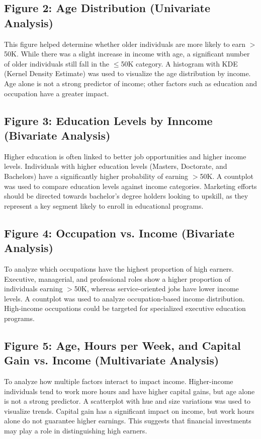 \documentclass[journal,onecolumn]{IEEEtran}
\begin{document}
\subsection{Figure 2: Age Distribution (Univariate Analysis)}
This figure helped determine whether older individuals are more likely to 
earn $>$50K. While there was a slight increase in income with age, a 
significant number of older individuals still fall in the $\leq$50K category.
A histogram with KDE (Kernel Density Estimate) was used to visualize the 
age distribution by income. Age alone is not a strong predictor of income; 
other factors such as education and occupation have a greater impact.

\subsection{Figure 3: Education Levels by Inncome (Bivariate Analysis)}
Higher education is often linked to better job opportunities and higher 
income levels. Individuals with higher education levels (Masters, Doctorate, 
and Bachelors) have a significantly higher probability of earning $>$50K. 
A countplot was used to compare education levels against income categories. 
Marketing efforts should be directed towards bachelor's degree holders 
looking to upskill, as they represent a key segment likely to enroll in 
educational programs.

\subsection{Figure 4: Occupation vs. Income (Bivariate Analysis)}
To analyze which occupations have the highest proportion of high earners. 
Executive, managerial, and professional roles show a higher proportion of 
individuals earning $>$50K, whereas service-oriented jobs have lower income 
levels. A countplot was used to analyze occupation-based income distribution. 
High-income occupations could be targeted for specialized executive education 
programs.

\subsection{Figure 5: Age, Hours per Week, and Capital Gain vs. Income (Multivariate Analysis)}
To analyze how multiple factors interact to impact income. Higher-income 
individuals tend to work more hours and have higher capital gains, but age 
alone is not a strong predictor. A scatterplot with hue and size variations 
was used to visualize trends. Capital gain has a significant impact on income, 
but work hours alone do not guarantee higher earnings. This suggests that 
financial investments may play a role in distinguishing high earners.
\end{document}
